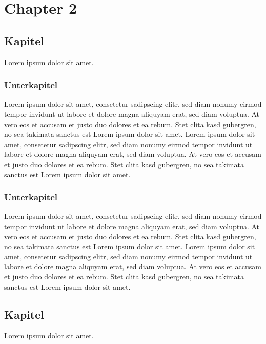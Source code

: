 \chapter{Chapter 2}

\section{Kapitel}
Lorem ipsum dolor sit amet.

\subsection{Unterkapitel}
Lorem ipsum dolor sit amet, consetetur sadipscing elitr, sed diam nonumy eirmod tempor invidunt ut labore et dolore magna aliquyam erat, sed diam voluptua. At vero eos et accusam et justo duo dolores et ea rebum. Stet clita kasd gubergren, no sea takimata sanctus est Lorem ipsum dolor sit amet. Lorem ipsum dolor sit amet, consetetur sadipscing elitr, sed diam nonumy eirmod tempor invidunt ut labore et dolore magna aliquyam erat, sed diam voluptua. At vero eos et accusam et justo duo dolores et ea rebum. Stet clita kasd gubergren, no sea takimata sanctus est Lorem ipsum dolor sit amet.

\subsection{Unterkapitel}
Lorem ipsum dolor sit amet, consetetur sadipscing elitr, sed diam nonumy eirmod tempor invidunt ut labore et dolore magna aliquyam erat, sed diam voluptua. At vero eos et accusam et justo duo dolores et ea rebum. Stet clita kasd gubergren, no sea takimata sanctus est Lorem ipsum dolor sit amet. Lorem ipsum dolor sit amet, consetetur sadipscing elitr, sed diam nonumy eirmod tempor invidunt ut labore et dolore magna aliquyam erat, sed diam voluptua. At vero eos et accusam et justo duo dolores et ea rebum. Stet clita kasd gubergren, no sea takimata sanctus est Lorem ipsum dolor sit amet.
\pagebreak

\section{Kapitel}
Lorem ipsum dolor sit amet.

